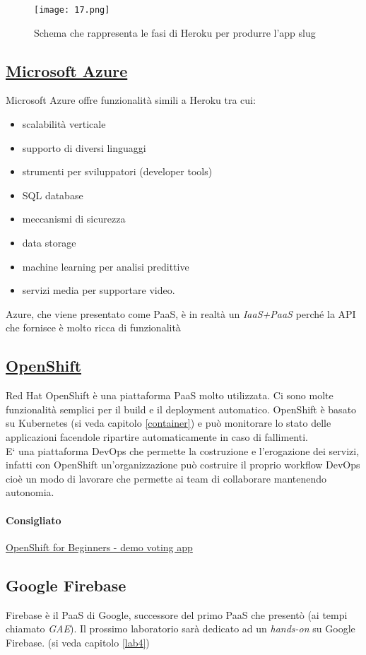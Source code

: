 \begin{figure}[h!]
    \centering
    \texttt{[image: 17.png]}
    \caption{Schema che rappresenta le fasi di Heroku per produrre l'app slug}
\end{figure}

\subsection{\href{https://www.youtube.com/watch?v=0d1OO79brYY}{Microsoft Azure}}
Microsoft Azure offre funzionalità simili a Heroku tra cui:
\begin{itemize}
    \item scalabilità verticale
    \item supporto di diversi linguaggi
    \item strumenti per sviluppatori (developer tools)
    \item SQL database
    \item meccanismi di sicurezza
    \item data storage
    \item machine learning per analisi predittive
    \item servizi media per supportare video.
\end{itemize}
Azure, che viene presentato come PaaS, è in realtà un \textit{IaaS+PaaS} perché la API che fornisce è molto ricca di funzionalità 

\subsection{\href{https://www.youtube.com/watch?v=XfTRyF6TX6o&list=PLaR6Rq6Z4Iqficb-XqeydZD_ZTD3XEwBp}{OpenShift}}
Red Hat OpenShift è una piattaforma PaaS molto utilizzata. Ci sono molte funzionalità semplici per il build e il deployment automatico. OpenShift è basato su Kubernetes (si veda capitolo \ref{container}) e può monitorare lo stato delle applicazioni facendole ripartire automaticamente in caso di fallimenti.\\
E` una piattaforma DevOps che permette la costruzione e l’erogazione dei servizi, infatti con OpenShift un'organizzazione può costruire il proprio workflow DevOps cioè un modo di lavorare che permette ai team di collaborare mantenendo autonomia.
\paragraph{Consigliato} \href{https://www.youtube.com/watch?v=IO_uap5wfUU}{OpenShift for Beginners - demo voting app}

\subsection{Google Firebase}
Firebase è il PaaS di Google, successore del primo PaaS che presentò (ai tempi chiamato \textit{GAE}). Il prossimo laboratorio sarà dedicato ad un \textit{hands-on} su Google Firebase. (si veda capitolo \ref{lab4})